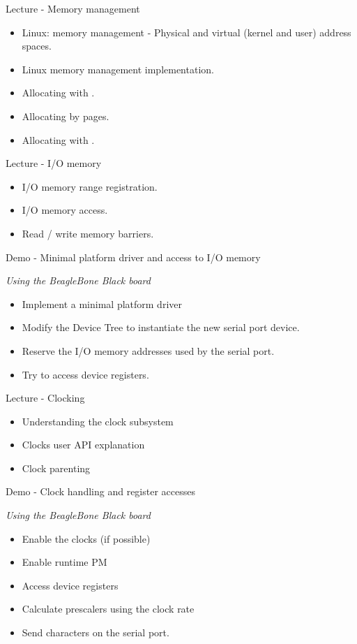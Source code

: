 \documentclass[a4paper,12pt,obeyspaces,spaces,hyphens]{article}
\begin{document}
\feagendaonecolumn
{Lecture - Memory management}
{
  \begin{itemize}
  \item Linux: memory management - Physical and virtual (kernel and user) address spaces.
  \item Linux memory management implementation.
  \item Allocating with .
  \item Allocating by pages.
  \item Allocating with .
  \end{itemize}
}

\feagendatwocolumn
{Lecture - I/O memory}
{
  \begin{itemize}
  \item I/O memory range registration.
  \item I/O memory access.
  \item Read / write memory barriers.
  \end{itemize}
}
{Demo - Minimal platform driver and access to I/O memory}
{
  {\em Using the BeagleBone Black board}
  \begin{itemize}
  \item Implement a minimal platform driver
  \item Modify the Device Tree to instantiate the new serial port
    device.
  \item Reserve the I/O memory addresses used by the serial port.
  \item Try to access device registers.
  \end{itemize}
}

\feagendatwocolumn
{Lecture - Clocking}
{
  \begin{itemize}
  \item Understanding the clock subsystem
  \item Clocks user API explanation
  \item Clock parenting
  \end{itemize}
}
{Demo - Clock handling and register accesses}
{
  {\em Using the BeagleBone Black board}
  \begin{itemize}
  \item Enable the clocks (if possible)
  \item Enable runtime PM
  \item Access device registers
  \item Calculate prescalers using the clock rate
  \item Send characters on the serial port.
  \end{itemize}
}
\end{document}
